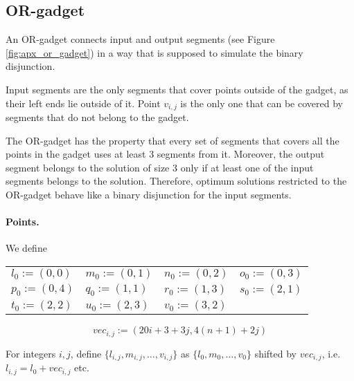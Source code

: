\subsection{OR-gadget}

An OR-gadget connects input and output segments (see Figure \ref{fig:apx_or_gadget})
in a way that is supposed to simulate the binary disjunction.

Input segments are the only segments that cover points outside of the gadget,
as their left ends lie outside of it.
Point $v_{i,j}$ is the only one that can be covered
by segments that do not belong to the gadget.

The OR-gadget has the property that every set of segments
that covers all the points in the gadget uses at least 3 segments from it.
Moreover, the output segment belongs to the solution of size 3
only if at least one of the input segments belongs to the solution.
Therefore, optimum solutions restricted to the OR-gadget behave
like a binary disjunction for the input segments.


\paragraph{Points.}
We define

\newcommand{\chooseOr}[3]{\mathsf{chooseOr}^{#1}_{#2,#3}}
\newcommand{\orMoveVariable}[2]{\mathsf{orMoveVariable}_{#1,#2}}
\newcommand{\pointsOr}[2]{\mathsf{pointsOr}_{#1,#2}}
\newcommand{\segmentsOr}[2]{\mathsf{segmentsOr}_{#1,#2}}



\newcommand{\clauseXFactor}{20}

\begin{center}
	\begin{tabular}{ l l l l}
		$l_0 := (0, 0)$ &
		$m_0 := (0, 1)$ &
		$n_0 := (0, 2)$ &
		$o_0 := (0, 3)$ \\
		$p_0 := (0, 4)$ &
		$q_0 := (1, 1)$ &
		$r_0 := (1, 3)$ &
		$s_0 := (2, 1)$ \\
		$t_0 := (2, 2)$ &
		$u_0 := (2, 3)$ &
		$v_0 := (3, 2)$ &
	\end{tabular}
\end{center}


$$vec_{i, j} := (\clauseXFactor i + 3 + 3j, 4(n+1) + 2j)$$

For integers $i,j$,
define 
$\{ l_{i, j}, m_{i, j}, \ldots, v_{i, j} \}$
as $\{l_0, m_0, \ldots, v_0\}$ shifted by $vec_{i, j}$,
i.e. ${l_{i,j} = l_0 + vec_{i,j}}$ etc.

